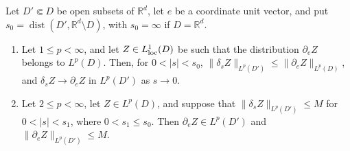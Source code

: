 \begin{lemma}\label{lem:difference-quotients}
Let $D'\Subset D$ be open subsets of $\mathbb R^d$, let $e$ be a coordinate unit vector, and put $s_0=\operatorname{dist}(D',\mathbb R^d\setminus D)$, with $s_0=\infty$ if $D=\mathbb R^d$.
\begin{enumerate}
\item Let $1\leq p<\infty$, and let $Z\in L^1_{\mathrm{loc}}(D)$ be such that the distribution $\partial_eZ$ belongs to $L^p(D)$. Then, for $0<|s|<s_0$, $\|\delta_sZ\|_{L^p(D')}\leq\|\partial_eZ\|_{L^p(D)}$, and $\delta_sZ\to\partial_eZ$ in $L^p(D')$ as $s\to0$.
\item Let $2\leq p<\infty$, let $Z\in L^p(D)$, and suppose that $\|\delta_sZ\|_{L^p(D')}\leq M$ for $0<|s|<s_1$, where $0<s_1\leq s_0$. Then $\partial_eZ\in L^p(D')$ and $\|\partial_eZ\|_{L^p(D')}\leq M$.
\end{enumerate}
\end{lemma}
